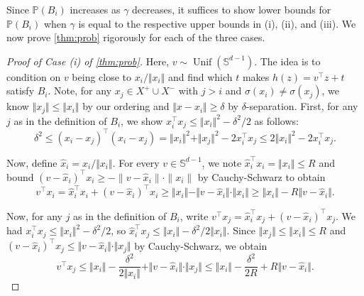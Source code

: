 \documentclass[aoap]{imsart}
\numberwithin{equation}{section}
\theoremstyle{definition}
\theoremstyle{remark}
\renewcommand{\hat}{\widehat}
\numberwithin{equation}{section}
\renewcommand{\S}{\mathbb{S}}
\newcommand{\0}{\mathbf{0}}
\newcommand{\1}{\mathbf{1}}
\renewcommand{\P}{\mathbb{P}}
\renewcommand{\S}{\mathbb{S}}
\DeclareMathOperator{\Unif}{Unif}
\numberwithin{equation}{section}
\begin{document}
Since $\P(B_i)$ increases as $\gamma$ decreases, it suffices to show lower bounds for $\P(B_i)$ when $\gamma$ is equal to the respective upper bounds in (i), (ii), and (iii). We now prove \cref{thm:prob} rigorously for each of the three cases.


\begin{proof}[Proof of Case (i) of \cref{thm:prob}]
Here, $v\sim \Unif(\S^{d-1})$. The idea is to condition on $v$ being close to $x_i/\Vert x_i\Vert$ and find which $t$ makes $h(z)=v^{\intercal}z+t$ satisfy $B_i$. Note, for any $x_{j} \in X^{+}\cup X^{-}$ with $j >i$ and $\sigma(x_i)\neq \sigma(x_j)$, we know $\Vert x_j\Vert \leq \Vert x_{i}\Vert$ by our ordering and $ \Vert x-x_{i}\Vert\geq \delta$ by $\delta$-separation. First, for any $j$ as in the definition of $B_i$, we show $x_i^{\intercal}x_j\leq \Vert x_i\Vert ^2 - \delta^2/2$ as follows:
\[
\delta^{2} \le (x_{i}-x_{j})^{\intercal}(x_{i}-x_{j}) 
= \Vert x_{i}\Vert ^{2}+\Vert x_{j}\Vert^{2}-2x_{i}^{\intercal}x_{j}
\leq 2\Vert x_i\Vert ^{2}-2x_{i}^{\intercal}x_{j}.
\]

Now, define $\hat{x}_{i}=x_{i}/\Vert x_{i}\Vert$. For every $v\in \S^{d-1}$, we note $\hat{x}_i^{\intercal}x_i=\Vert x_i\Vert\leq R$ and bound $\left(v-\hat{x}_{i}\right)^{\intercal}x_{i}\geq-\|v-\hat{x}_{i}\|\cdot \|x_{i}\|$ by Cauchy-Schwarz to obtain
\begin{equation}\label{eq:vxi}
v^{\intercal}x_{i} = \hat{x}_{i}^{\intercal}x_{i} + \left(v-\hat{x}_{i}\right)^{\intercal}x_{i} \geq \Vert x_{i}\Vert - \Vert v-\hat{x}_{i}\Vert \cdot \Vert x_{i}\Vert\geq \Vert x_{i}\Vert - R\Vert v-\hat{x}_{i}\Vert.
\end{equation}

Now, for any $j$ as in the definition of $B_i$, write $v^{\intercal}x_{j} = \hat{x}_{i}^{\intercal}x_{j} + \left(v-\hat{x}_{i}\right)^{\intercal}x_{j}$. We had $x_i^{\intercal}x_j\leq \Vert x_i\Vert ^2 - \delta^2/2$, so $\hat{x}_i^{\intercal}x_j\leq \Vert x_i\Vert - \delta^2/2\Vert x_i\Vert$. Since $\Vert x_j\Vert \leq \Vert x_i\Vert\leq R$ and $\left(v-\hat{x}_{i}\right)^{\intercal}x_{j}\leq \Vert v-\hat{x}_{i}\Vert\cdot \Vert x_{j}\Vert$ by Cauchy-Schwarz, we obtain
\begin{equation}\label{eq:vxj}
v^{\intercal}x_{j}  \leq \Vert x_{i}\Vert -\frac{\delta^{2}}{2\Vert x_{i}\Vert} + \Vert v-\hat{x}_{i}\Vert\cdot \Vert x_{j}\Vert \leq \Vert x_{i}\Vert -\frac{\delta^{2}}{2R} + R\Vert v-\hat{x}_{i}\Vert.
\end{equation}


\end{proof}
\end{document}
